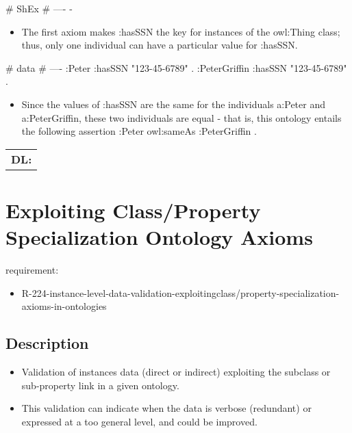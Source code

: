 \documentclass{llncs}
\newenvironment{DL}{
  \scriptsize
  \sffamily
  \vspace{0.3cm}
  \begin{tabular}{l}
	\textbf{DL:} \\

}{
  \end{tabular}
  \linebreak
}
\newcommand{\tb}[1]{\todo[size=\small, color=blue!40]{\textbf{Thomas:} #1}}
\begin{document}
\begin{ex}
# ShEx
# ----
-
\end{ex}

\begin{itemize}
	\item The first axiom makes :hasSSN the key for instances of the owl:Thing class; thus, only one individual can have a particular value for :hasSSN. 
\end{itemize}

\begin{ex}
# data
# ----
:Peter :hasSSN "123-45-6789" . 
:PeterGriffin :hasSSN "123-45-6789" . 
\end{ex}

\begin{itemize}
	\item Since the values of :hasSSN are the same for the individuals a:Peter and a:PeterGriffin, these two individuals are equal - that is, this ontology entails the following assertion :Peter owl:sameAs :PeterGriffin . 
\end{itemize}

\begin{DL}

\end{DL}

\tb{ToDo: DL}

\section{Exploiting Class/Property Specialization Ontology Axioms}

requirement:

\begin{itemize}
	\item R-224-instance-level-data-validation-exploitingclass/property-specialization-axioms-in-ontologies
\end{itemize}

\subsection{Description}

\begin{itemize}
  \item Validation of instances data (direct or indirect) exploiting the subclass or sub-property link in a given ontology.
  \item This validation can indicate when the data is verbose (redundant) or expressed at a too general level, and could be improved.
\end{itemize}
\end{document}
